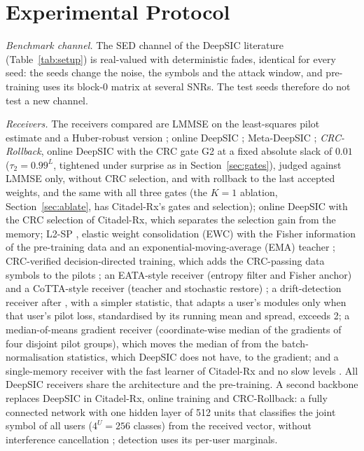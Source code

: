 \documentclass[journal]{IEEEtran}
\theoremstyle{remark}
\begin{document}
\section{Experimental Protocol}\label{sec:setup}

\textit{Benchmark channel.} The SED channel of the DeepSIC literature (Table~\ref{tab:setup}) is real-valued with deterministic fades, identical for every seed: the seeds change the noise, the symbols and the attack window, and pre-training uses its block-0 matrix at several SNRs. The test seeds therefore do not test a new channel.

\textit{Receivers.} The receivers compared are LMMSE on the least-squares pilot estimate and a Huber-robust version
\cite{huber1964}; online DeepSIC \cite{shlezinger2021}; Meta-DeepSIC \cite{raviv2023};
\emph{CRC-Rollback}, online DeepSIC with the CRC gate G2 at a fixed absolute slack of $0.01$ ($\tau_2=0.99^{L}$, tightened under surprise as in
Section~\ref{sec:gates}), judged against LMMSE only, without CRC selection, and with rollback to the
last accepted weights, and the same with all three gates (the $K=1$ ablation, Section~\ref{sec:ablate},
has Citadel-Rx's gates and selection); online DeepSIC with the CRC selection of Citadel-Rx, which separates
the selection gain from the memory; L2-SP \cite{l2sp2018}, elastic weight consolidation (EWC) with the Fisher information of the pre-training data \cite{ewc2017} and an exponential-moving-average (EMA) teacher \cite{meanteacher2017}; CRC-verified
decision-directed training, which adds the CRC-passing data symbols to the pilots \cite{viterbinet2020,schibisch2018};
an EATA-style receiver (entropy filter and Fisher anchor) \cite{eata2022} and a CoTTA-style receiver (teacher and stochastic restore) \cite{cotta2022}; a drift-detection receiver after \cite{uzlaner2024}, with a simpler statistic, that adapts a user's
modules only when that user's pilot loss, standardised by its running mean and spread, exceeds 2; a
median-of-means gradient receiver (coordinate-wise median of the gradients of four disjoint pilot
groups), which moves the median of \cite{medbn} from the batch-normalisation statistics, which DeepSIC does not have, to the gradient; and a single-memory receiver with the fast learner of
Citadel-Rx and no slow levels \cite{behrouz2025titans}. All DeepSIC receivers share the
architecture and the pre-training. A second backbone replaces DeepSIC in Citadel-Rx, online
training and CRC-Rollback: a fully connected network with one hidden layer of 512 units that
classifies the joint symbol of all users ($4^U=256$ classes) from the received vector, without
interference cancellation \cite{oshea2017,samuel2019}; detection uses its per-user marginals.
\end{document}
